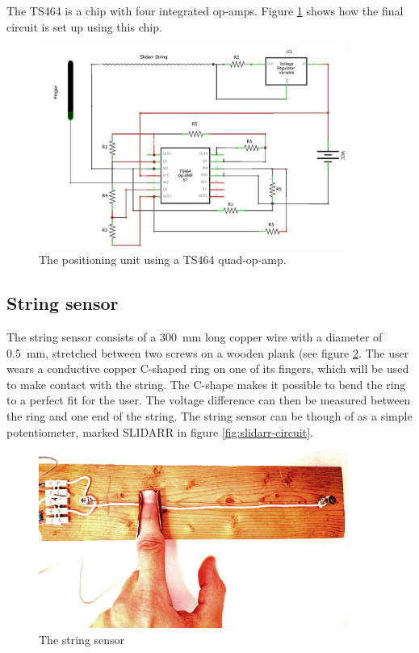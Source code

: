 \documentclass{article}
\begin{document}
The TS464 is a chip with four integrated op-amps. Figure \ref{fig:slidarr-circuit2} shows how the final circuit is set up using this chip.

\begin{figure}[h]
  \centering
  \includegraphics[width=0.9\textwidth]{slidarr-circuit2}
  \caption{The positioning unit using a TS464 quad-op-amp.}
  \label{fig:slidarr-circuit2}
\end{figure}

\subsection{String sensor}
The string sensor consists of a \SI{300}{\milli\meter} long copper wire with a diameter of \SI{0.5}{\milli\meter}, stretched between two screws on a wooden plank (see figure \ref{fig:string_sensor}.  The user wears a conductive copper C-shaped ring on one of its fingers, which will be used to make contact with the string. The C-shape makes it possible to bend the ring to a perfect fit for the user. The voltage difference can then be measured between the ring and one end of the string. The string sensor can be though of as a simple potentiometer, marked SLIDARR in figure \ref{fig:slidarr-circuit}.

\begin{figure}[h]
  \centering
  \includegraphics[width=0.9\textwidth]{string-sensor}
  \caption{The string sensor}
  \label{fig:string_sensor}
\end{figure}
\end{document}
